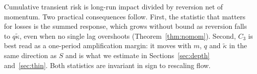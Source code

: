 Cumulative transient risk is long-run impact divided by reversion net of momentum. Two practical consequences follow. First, the statistic that matters for losses is the summed response, which grows without bound as reversion falls to $q\tilde\kappa$, even when no single lag overshoots (Theorem~\ref{thm:nomom}). Second, $C_3$ is best read as a one-period amplification margin: it moves with $m$, $q$ and $\tilde\kappa$ in the same direction as $S$ and is what we estimate in Sections~\ref{sec:depth} and~\ref{sec:thin}. Both statistics are invariant in sign to rescaling flow.

